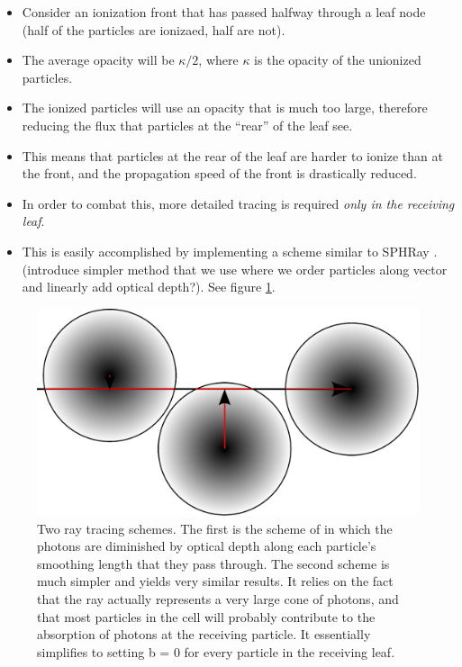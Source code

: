 \begin{itemize}
\item Consider an ionization front that has passed halfway through a leaf node (half of the particles are ionizaed, half are not).
\item The average opacity will be $\kappa/2$, where $\kappa$ is the opacity of the unionized particles.
\item The ionized particles will use an opacity that is much too large, therefore reducing the flux that particles at the ``rear'' of the leaf see.
\item This means that particles at the rear of the leaf are harder to ionize than at the front, and the propagation speed of the front is drastically reduced.
\item In order to combat this, more detailed tracing is required \emph{only in the receiving leaf}.
\item This is easily accomplished by implementing a scheme similar to SPHRay \citep{altayEt08}. (introduce simpler method that we use where we order particles along vector and linearly add optical depth?). See figure \ref{fig:raytracing}.
\end{itemize}

\begin{figure}
\includegraphics[width=\textwidth]{graphics/raytrace.eps}
\caption[Ray tracing schemes for receiving cells.]{Two ray tracing schemes. The first is the scheme of \citet{altayEt08} in which the photons are diminished by optical depth along each particle's smoothing length that they pass through. The second scheme is much simpler and yields very similar results. It relies on the fact that the ray actually represents a very large cone of photons, and that most particles in the cell will probably contribute to the absorption of photons at the receiving particle. It essentially simplifies to setting b = 0 for every particle in the receiving leaf.}
\label{fig:raytracing}
\end{figure}

